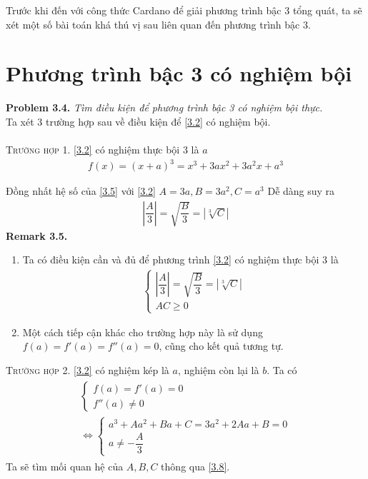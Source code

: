 \documentclass[a4paper,oneside]{book}
\numberwithin{equation}{chapter}
\begin{document}
Trước khi đến với công thức Cardano để giải phương trình bậc 3 tổng quát, ta sẽ xét một số bài toán khá thú vị sau liên quan đến phương trình bậc 3.
\section{Phương trình bậc 3 có nghiệm bội}
\textbf{Problem 3.4.} \textit{Tìm điều kiện để phương trình bậc 3 có nghiệm bội thực.}\\

Ta xét 3 trường hợp sau về điều kiện để \eqref{3.2} có nghiệm bội.\\
\\
\textsc{Trường hợp 1.} \eqref{3.2} có nghiệm thực bội 3 là $a$\begin{align}
f(x) = {\left( {x + a} \right)^3} = {x^3} + 3a{x^2} + 3{a^2}x + {a^3}
\end{align}

Đồng nhất hệ số của \eqref{3.5} với \eqref{3.2} $A = 3a,B = 3{a^2},C = {a^3}$
Dễ dàng suy ra 
\begin{align}
\left| {\dfrac{A}{3}} \right| = \sqrt {\dfrac{B}{3}}  = \left| {\sqrt[3]{C}} \right|
\end{align}
\textbf{Remark 3.5.} 
\begin{enumerate}
\item Ta có điều kiện cần và đủ để phương trình \eqref{3.2} có nghiệm thực bội 3 là
\begin{align}
\label{3.8}
\left\{ {\begin{array}{*{20}{c}}
{\left| {\dfrac{A}{3}} \right| = \sqrt {\dfrac{B}{3}}  = \left| {\sqrt[3]{C}} \right|}\\
{AC \ge 0}
\end{array}} \right.
\end{align}
\item Một cách tiếp cận khác cho trường hợp này là sử dụng $f\left( a \right) = f'\left( a \right) = f''\left( a \right) = 0$, cũng cho kết quả tương tự.
\end{enumerate}
\textsc{Trường hợp 2.} \eqref{3.2} có nghiệm kép là $a$, nghiệm còn lại là $b$. Ta có 
\begin{align}
\label{3.9}
\begin{array}{c}
\left\{ {\begin{array}{*{20}{c}}
{f\left( a \right) = f'\left( a \right) = 0}\\
{f''\left( a \right) \ne 0}
\end{array}} \right.\\
 \Leftrightarrow \left\{ {\begin{array}{*{20}{c}}
{{a^3} + A{a^2} + Ba + C = 3{a^2} + 2Aa + B = 0}\\
{a \ne -\dfrac{A}{3}}
\end{array}} \right.
\end{array}
\end{align}
Ta sẽ tìm mối quan hệ của $A,B,C$ thông qua \eqref{3.8}.
\end{document}

